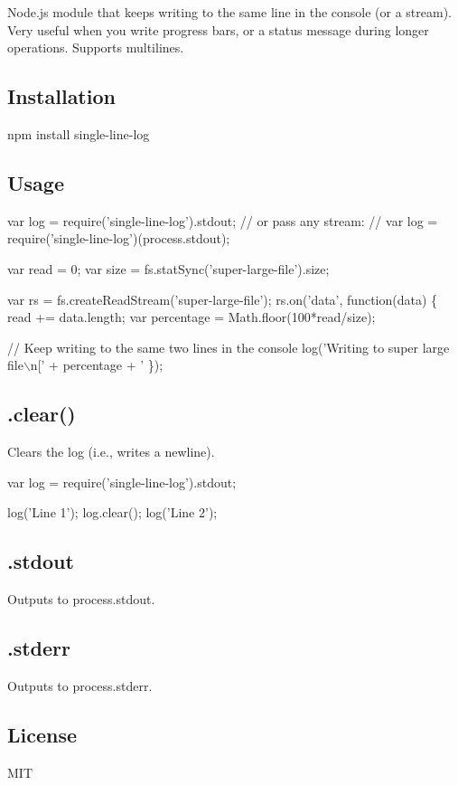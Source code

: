 Node.\+js module that keeps writing to the same line in the console (or a stream). Very useful when you write progress bars, or a status message during longer operations. Supports multilines.

\subsection*{Installation}

\begin{DoxyVerb}npm install single-line-log
\end{DoxyVerb}


\subsection*{Usage}


\begin{DoxyCode}
var log = require('single-line-log').stdout;
// or pass any stream:
// var log = require('single-line-log')(process.stdout);

var read = 0;
var size = fs.statSync('super-large-file').size;

var rs = fs.createReadStream('super-large-file');
rs.on('data', function(data) \{
    read += data.length;
    var percentage = Math.floor(100*read/size);

    // Keep writing to the same two lines in the console
    log('Writing to super large file\(\backslash\)n[' + percentage + '%
\});
\end{DoxyCode}


\subsection*{.clear()}

Clears the log (i.\+e., writes a newline).


\begin{DoxyCode}
var log = require('single-line-log').stdout;

log('Line 1');
log.clear();
log('Line 2');
\end{DoxyCode}


\subsection*{.stdout}

Outputs to {\ttfamily process.\+stdout}.

\subsection*{.stderr}

Outputs to {\ttfamily process.\+stderr}.

\subsection*{License}

M\+IT 
